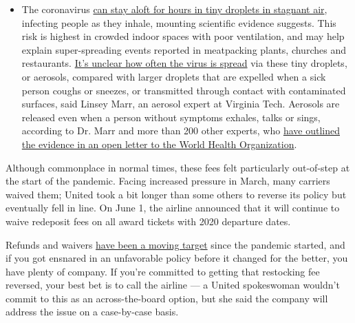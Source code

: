 \begin{itemize}
  \begin{itemize}
  \tightlist
  \item
    The coronavirus
    \href{https://www.nytimes.com/2020/07/04/health/239-experts-with-one-big-claim-the-coronavirus-is-airborne.html?action=click\&pgtype=Article\&state=default\&region=MAIN_CONTENT_3\&context=storylines_faq}{can
    stay aloft for hours in tiny droplets in stagnant air}, infecting
    people as they inhale, mounting scientific evidence suggests. This
    risk is highest in crowded indoor spaces with poor ventilation, and
    may help explain super-spreading events reported in meatpacking
    plants, churches and restaurants.
    \href{https://www.nytimes.com/2020/07/06/health/coronavirus-airborne-aerosols.html?action=click\&pgtype=Article\&state=default\&region=MAIN_CONTENT_3\&context=storylines_faq}{It's
    unclear how often the virus is spread} via these tiny droplets, or
    aerosols, compared with larger droplets that are expelled when a
    sick person coughs or sneezes, or transmitted through contact with
    contaminated surfaces, said Linsey Marr, an aerosol expert at
    Virginia Tech. Aerosols are released even when a person without
    symptoms exhales, talks or sings, according to Dr. Marr and more
    than 200 other experts, who
    \href{https://academic.oup.com/cid/article/doi/10.1093/cid/ciaa939/5867798}{have
    outlined the evidence in an open letter to the World Health
    Organization}.
  \end{itemize}
\end{itemize}

Although commonplace in normal times, these fees felt particularly
out-of-step at the start of the pandemic. Facing increased pressure in
March, many carriers waived them; United took a bit longer than some
others to reverse its policy but eventually fell in line. On June 1, the
airline announced that it will continue to waive redeposit fees on all
award tickets with 2020 departure dates.

Refunds and waivers
\href{https://www.nytimes.com/2020/04/11/travel/coronavirus-travel-trip-refunds.html}{have
been a moving target} since the pandemic started, and if you got
ensnared in an unfavorable policy before it changed for the better, you
have plenty of company. If you're committed to getting that restocking
fee reversed, your best bet is to call the airline --- a United
spokeswoman wouldn't commit to this as an across-the-board option, but
she said the company will address the issue on a case-by-case basis.

